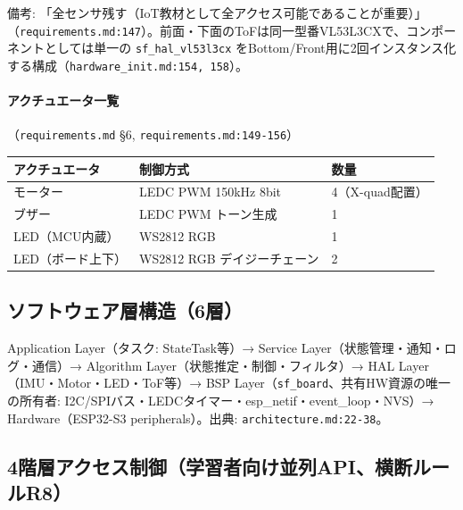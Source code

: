 \documentclass[a4paper,10pt]{ltjsarticle}
\begin{document}
備考: 「全センサ残す（IoT教材として全アクセス可能であることが重要）」（\texttt{requirements.md:147}）。前面・下面のToFは同一型番VL53L3CXで、コンポーネントとしては単一の \texttt{sf\_hal\_vl53l3cx} をBottom/Front用に2回インスタンス化する構成（\texttt{hardware\_init.md:154, 158}）。

\paragraph{アクチュエータ一覧}（\texttt{requirements.md} §6, \texttt{requirements.md:149-156}）

\begin{table}[h]
\centering\footnotesize
\begin{tabularx}{\textwidth}{@{}lYl@{}}
\toprule
アクチュエータ & 制御方式 & 数量 \\
\midrule
モーター & LEDC PWM 150kHz 8bit & 4（X-quad配置） \\
ブザー & LEDC PWM トーン生成 & 1 \\
LED（MCU内蔵） & WS2812 RGB & 1 \\
LED（ボード上下） & WS2812 RGB デイジーチェーン & 2 \\
\bottomrule
\end{tabularx}
\end{table}

\subsection{ソフトウェア層構造（6層）}

Application Layer（タスク: StateTask等）→ Service Layer（状態管理・通知・ログ・通信）→ Algorithm Layer（状態推定・制御・フィルタ）→ HAL Layer（IMU・Motor・LED・ToF等）→ BSP Layer（\texttt{sf\_board}、共有HW資源の唯一の所有者: I2C/SPIバス・LEDCタイマー・esp\_netif・event\_loop・NVS）→ Hardware（ESP32-S3 peripherals）。出典: \texttt{architecture.md:22-38}。

\subsection{4階層アクセス制御（学習者向け並列API、横断ルールR8）}
\end{document}
